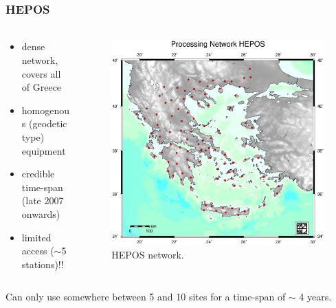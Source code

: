 \documentclass{beamer}
\begin{document}
\begin{frame}\frametitle{HEPOS}\framesubtitle{}
\begin{columns}[T] %
\begin{column}{.40\textwidth}
  \begin{itemize}
    \item<pro@1-> dense network, covers all of Greece
    \item<pro@1-> homogenous (geodetic type) equipment
    \item<con@1-> credible time-span (late 2007 onwards)
    \item<con@1-> limited access ($\sim$5 stations)!!
  \end{itemize}
\end{column}%
\hfill%
\begin{column}{.68\textwidth}
 \begin{figure}
 \begin{center}
 \includegraphics[trim={1cm 2cm 1cm 2.5cm},clip,width=.85\textwidth]{img/heposnet.eps}
 \caption{HEPOS network.}
 \label{fig:hepos}
 \end{center}
 \end{figure}
\end{column}%
\end{columns}
  \begin{block}{}
  Can only use somewhere between 5 and 10 sites for a time-span of $\sim$ 4 years.
  \end{block}
\end{frame}
\end{document}
